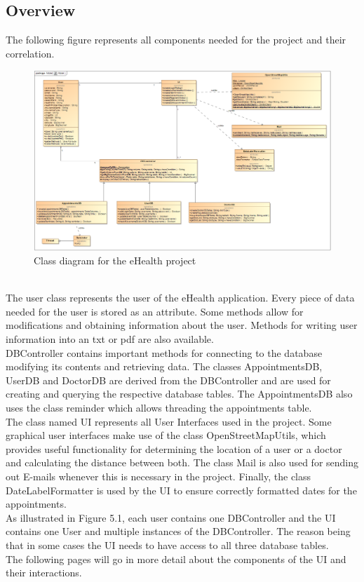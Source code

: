 \documentclass[a4paper, 12pt]{report}
\begin{document}
\subsection{Overview}
The following figure represents all components needed for the project and their correlation.
\begin{figure}[!h]
\includegraphics[width=\linewidth]{clImg.png} 
\caption{Class diagram for the eHealth project}
\end{figure}
\\The user class represents the user of the eHealth application. Every piece of data needed for the user is stored as an attribute. Some methods allow for modifications and obtaining information about the user. Methods for writing user information into an txt or pdf are also available. \\
DBController contains important methods for connecting to the database modifying its contents and retrieving data. The classes AppointmentsDB, UserDB and DoctorDB are derived from the DBController and are used for creating and querying the respective database tables. The AppointmentsDB also uses the class reminder which allows threading the appointments table.\\The class named UI represents all User Interfaces used in the project. Some graphical user interfaces make use of the class OpenStreetMapUtils, which provides useful functionality for determining the location of a user or a doctor and calculating the distance between both. The class Mail is also used for sending out E-mails whenever this is necessary in the project. Finally, the class DateLabelFormatter is used by the UI to ensure correctly formatted dates for the appointments. \\
As illustrated in Figure 5.1, each user contains one DBController and the UI contains one User and multiple instances of the DBController. The reason being that in some cases the UI needs to have access to all three database tables.\\ The following pages will go in more detail about the components of the UI and their interactions.
\end{document}
